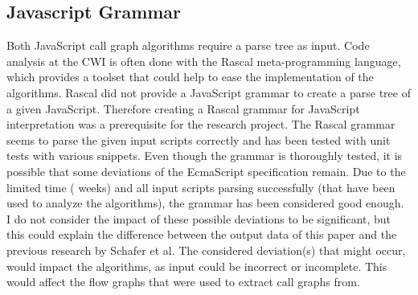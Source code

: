 \documentclass[journal,10pt]{IEEEtran} %
\begin{document}
\subsection{Javascript Grammar}
Both JavaScript call graph algorithms require a parse tree as input. Code analysis at the CWI is often done with the Rascal meta-programming language, which provides a toolset that could help to ease the implementation of the algorithms. Rascal did not provide a JavaScript grammar to create a parse tree of a given JavaScript. Therefore creating a Rascal grammar for JavaScript interpretation was a prerequisite for the research project. The Rascal grammar seems to parse the given input scripts correctly and has been tested with unit tests with various snippets. Even though the grammar is thoroughly tested, it is possible that some deviations of the EcmaScript specification remain.
Due to the limited time ( weeks) and all input scripts parsing successfully (that have been used to analyze the algorithms), the grammar has been considered good enough. I do not consider the impact of these possible deviations to be significant, but this could explain the difference between the output data of this paper and the previous research by Schafer et al. %
The considered deviation(s) that might occur, would impact the algorithms, as input could be incorrect or incomplete. This would affect the flow graphs that were used to extract call graphs from.
\end{document}
